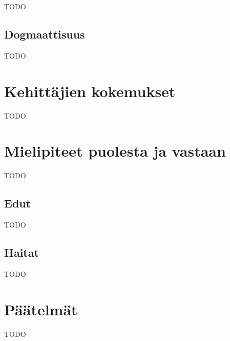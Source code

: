 TODO

\subsection{Dogmaattisuus}

TODO

\section{Kehittäjien kokemukset}

TODO

\section{Mielipiteet puolesta ja vastaan}

TODO

\subsection{Edut}

TODO

\subsection{Haitat}

TODO

\section{Päätelmät}

TODO